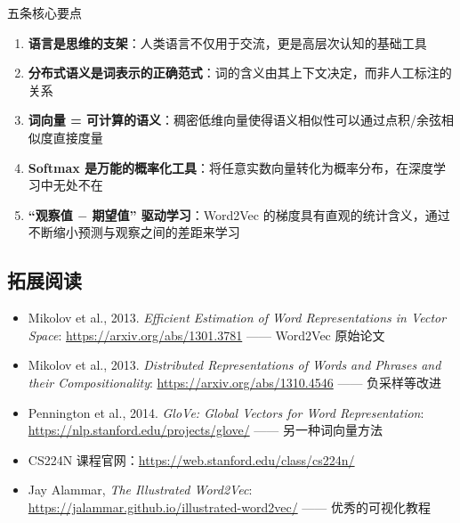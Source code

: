 \documentclass[a4paper]{article}
\begin{document}
\begin{importantbox}{五条核心要点}
\begin{enumerate}
    \item \textbf{语言是思维的支架}：人类语言不仅用于交流，更是高层次认知的基础工具
    \item \textbf{分布式语义是词表示的正确范式}：词的含义由其上下文决定，而非人工标注的关系
    \item \textbf{词向量 = 可计算的语义}：稠密低维向量使得语义相似性可以通过点积/余弦相似度直接度量
    \item \textbf{Softmax 是万能的概率化工具}：将任意实数向量转化为概率分布，在深度学习中无处不在
    \item \textbf{``观察值 $-$ 期望值'' 驱动学习}：Word2Vec 的梯度具有直观的统计含义，通过不断缩小预测与观察之间的差距来学习
\end{enumerate}
\end{importantbox}

\subsection{拓展阅读}

\begin{itemize}
    \item Mikolov et al., 2013. \textit{Efficient Estimation of Word Representations in Vector Space}: \url{https://arxiv.org/abs/1301.3781} —— Word2Vec 原始论文
    \item Mikolov et al., 2013. \textit{Distributed Representations of Words and Phrases and their Compositionality}: \url{https://arxiv.org/abs/1310.4546} —— 负采样等改进
    \item Pennington et al., 2014. \textit{GloVe: Global Vectors for Word Representation}: \url{https://nlp.stanford.edu/projects/glove/} —— 另一种词向量方法
    \item CS224N 课程官网：\url{https://web.stanford.edu/class/cs224n/}
    \item Jay Alammar, \textit{The Illustrated Word2Vec}: \url{https://jalammar.github.io/illustrated-word2vec/} —— 优秀的可视化教程
\end{itemize}
\end{document}
